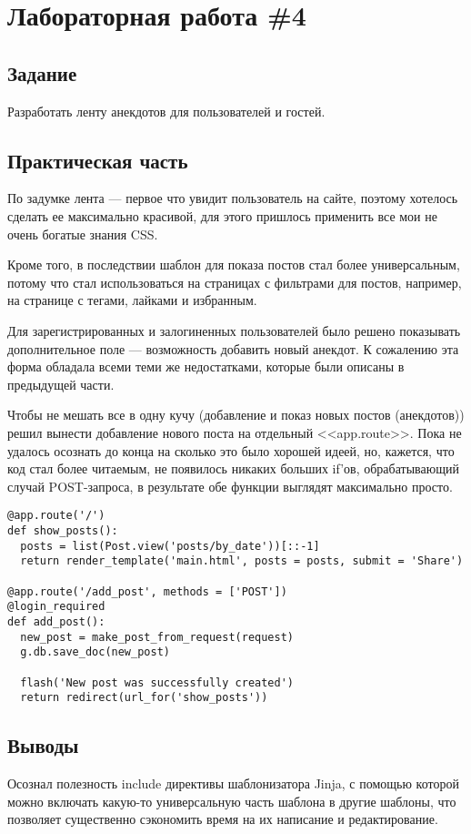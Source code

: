 \documentclass[14pt, a4paper]{extreport}
\begin{document}
\section*{Лабораторная работа \#4}
\subsection*{Задание}
Разработать ленту анекдотов для пользователей и гостей.

\subsection*{Практическая часть}
По задумке лента --- первое что увидит пользователь на сайте, поэтому
хотелось сделать ее максимально красивой, для этого пришлось применить
все мои не очень богатые знания CSS.

Кроме того, в последствии шаблон для показа постов стал более универсальным,
потому что стал использоваться на страницах с фильтрами для постов, например,
на странице с тегами, лайками и избранным.

Для зарегистрированных и залогиненных  пользователей было решено показывать
дополнительное поле --- возможность добавить новый анекдот.
К сожалению эта форма обладала всеми теми же недостатками, которые были описаны в
предыдущей части.

Чтобы не мешать все в одну кучу (добавление и показ новых постов (анекдотов))
решил вынести добавление нового поста на отдельный <<app.route>>. Пока не удалось
осознать до конца на сколько это было хорошей идеей, но, кажется, что код стал более читаемым,
не появилось никаких больших if'ов, обрабатывающий случай POST-запроса, в результате обе функции
выглядят максимально просто.

\begin{lstlisting}
@app.route('/')
def show_posts():
  posts = list(Post.view('posts/by_date'))[::-1]
  return render_template('main.html', posts = posts, submit = 'Share')

@app.route('/add_post', methods = ['POST'])
@login_required
def add_post():
  new_post = make_post_from_request(request)
  g.db.save_doc(new_post)

  flash('New post was successfully created')
  return redirect(url_for('show_posts'))
\end{lstlisting}

\subsection*{Выводы}
Осознал полезность include директивы шаблонизатора Jinja, с помощью
которой можно включать какую-то универсальную часть шаблона в другие шаблоны,
что позволяет существенно сэкономить время на их написание и редактирование.
\end{document}
